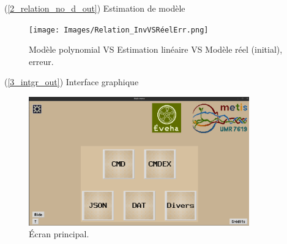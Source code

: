 \documentclass[12pt]{article}
\begin{document}
\newpage
    \label{2_relation_no_d_in} (\ref{2_relation_no_d_out}) Estimation de modèle

    \begin{figure}[ht!]
        \centering
        \texttt{[image: Images/Relation\_InvVSRéelErr.png]}  
        \caption{Modèle polynomial VS Estimation linéaire VS Modèle réel (initial), erreur.}
    \end{figure}

    \label{3_intgr_in} (\ref{3_intgr_out}) Interface graphique
    \begin{figure}[ht!]
        \centering
        \includegraphics[width=0.85\textwidth]{Images/IntGraph_mm.png}
        \caption{Écran principal.}
    \end{figure}
\end{document}
